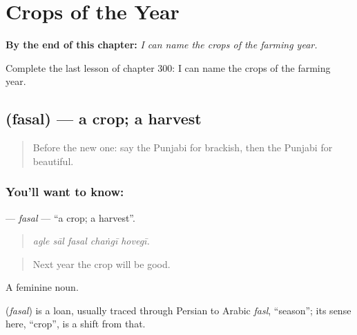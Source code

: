 
\chapter{Crops of the Year}
\label{ch:pa-a2-crops-of-the-year}

\begin{chapteropening}
\textbf{By the end of this chapter:} \emph{I can name the crops of the farming year.}

Complete the last lesson of chapter 300: I can name the crops of the farming year.
\end{chapteropening}

\section[\texorpdfstring{\pa{ਫ਼ਸਲ} (fasal)}{ਫ਼ਸਲ (fasal)}]{ (fasal) — a crop; a harvest}

\label{lesson:PA-C300-fasal}



\begin{quote}
Before the new one: say the Punjabi for brackish, then the Punjabi for beautiful.
\end{quote}

\subsection*{You'll want to know: }
\textbf{} — \emph{fasal} — \textquotedblleft{}a crop; a harvest\textquotedblright{}.

\begin{quote}
    
\end{quote}

\begin{quote}
\emph{agle sāl fasal chaṅgī hovegī.}
\end{quote}

\begin{quote}
Next year the crop will be good.
\end{quote}

A feminine noun.

\begin{cousinweb}
\textbf{} (\emph{fasal}) is a loan, usually traced through Persian to Arabic \emph{fasl}, \textquotedblleft{}season\textquotedblright{}; its sense here, \textquotedblleft{}crop\textquotedblright{}, is a shift from that.
\end{cousinweb}

